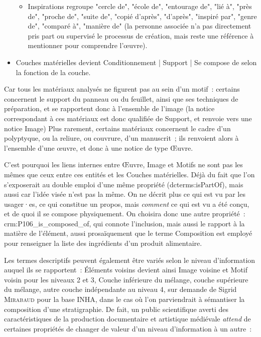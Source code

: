 \documentclass[a4paper,12pt, twoside]{book}
\begin{document}
\begin{itemize}
\begin{itemize}
        \item \textsf{Inspirations} regroupe \textsf{"cercle de", "école de", "entourage de", "lié à", "près de", "proche de", "suite de", "copié d'après", "d'après", "inspiré par", "genre de", "comparé à", "manière de"} (la personne associée n’a pas directement pris part ou supervisé le processus de création, mais reste une référence à mentionner pour comprendre l’œuvre).\\
    \end{itemize}

    \item \textsf{Couches matérielles} devient \textsf{Conditionnement | Support | Se compose de} selon la fonction de la couche.
\end{itemize}

Car tous les matériaux analysés ne figurent pas au sein d’un motif~: certains concernent le support du panneau ou du feuillet, ainsi que ses techniques de préparation, et se rapportent donc à l’ensemble de l’image (la notice correspondant à ces matériaux est donc qualifiée de \textsf{Support}, et renvoie vers une notice \textsf{Image}) Plus rarement, certains matériaux concernent le cadre d’un polyptyque, ou la reliure, ou couvrure, d’un manuscrit~; ils renvoient alors à l’ensemble d’une œuvre, et donc à une notice de type \textsf{Œuvre}.

C’est pourquoi les liens internes entre \textsf{Œuvre, Image} et \textsf{Motifs} ne sont pas les mêmes que ceux entre ces entités et les \textsf{Couches matérielles}. Déjà du fait que l’on s’exposerait au double emploi d’une même propriété (\textsf{dcterms:isPartOf}), mais aussi car l’idée visée n’est pas la même. On ne décrit plus ce qui est vu par les usager·es, ce qui constitue un propos, mais \textit{comment} ce qui est vu a été conçu, et de quoi il se compose physiquement. On choisira donc une autre propriété~: \textsf{crm:P106\_is\_composed\_of}, qui connote l’inclusion, mais aussi le rapport à la matière de l’élément, aussi prosaïquement que le terme \textsf{Composition} est employé pour renseigner la liste des ingrédients d’un produit alimentaire.

Les termes descriptifs peuvent également être variés selon le niveau d’information auquel ils se rapportent~: \textsf{Éléments voisins} devient ainsi \textsf{Image voisine} et \textsf{Motif voisin} pour les niveaux 2 et 3, \textsf{Couche inférieure du mélange, couche supérieure du mélange, autre couche indépendante} au niveau 4, sur demande de Sigrid \textsc{Mirabaud} pour la base INHA, dans le cas où l’on parviendrait à sémantiser la composition d’une stratigraphie. De fait, un public scientifique averti des caractéristiques de la production documentaire et artistique médiévale \textit{attend} de certaines propriétés de changer de valeur d’un niveau d’information à un autre~:
\end{document}
